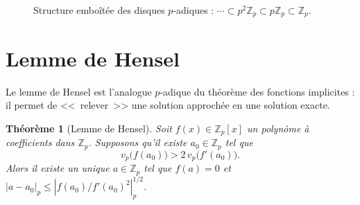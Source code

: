 \documentclass[12pt,a4paper,openany]{book}
\theoremstyle{definition}
\theoremstyle{plain}
\newtheorem{theoreme}[definition]{Théorème}
\theoremstyle{remark}
\newcommand{\Z}{\mathbb{Z}}
\newcommand{\abs}[1]{\left|#1\right|}
\begin{document}
\begin{figure}[ht]
\centering
{}
\caption{Structure emboîtée des disques $p$-adiques : $\cdots \subset p^2\Z_p \subset p\Z_p \subset \Z_p$.}
\label{fig:disques-p-adiques}
\end{figure}

\section{Lemme de Hensel}
\label{sec:hensel}

Le lemme de Hensel est l'analogue $p$-adique du théorème
des fonctions implicites : il permet de <<~relever~>> une solution approchée en
une solution exacte.

\begin{theoreme}[Lemme de Hensel]
\label{thm:hensel}
Soit $f(x) \in \Z_p[x]$ un polynôme à coefficients dans $\Z_p$. Supposons qu'il
existe $a_0 \in \Z_p$ tel que
\[
  v_p\bigl(f(a_0)\bigr) > 2\, v_p\bigl(f'(a_0)\bigr).
\]
Alors il existe un unique $a \in \Z_p$ tel que $f(a) = 0$ et
$\abs{a - a_0}_p \leq \abs{f(a_0)/f'(a_0)^2}_p^{1/2}$.
\end{theoreme}
\end{document}
